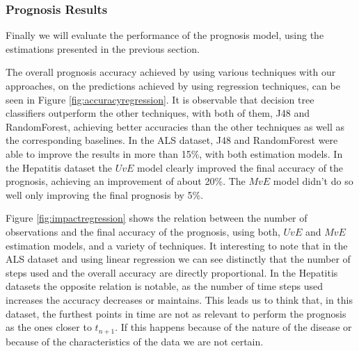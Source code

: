 \subsubsection{Prognosis Results}
\label{subsubsection:prognosis_regression}

Finally we will evaluate the performance of the prognosis model, using the estimations presented in the previous section.

The overall prognosis accuracy achieved by using various techniques with our approaches, on the predictions achieved by using regression 
techniques, can be seen in Figure \ref{fig:accuracyregression}. It is observable that decision tree classifiers outperform the other techniques, with
both of them, J48 and RandomForest, achieving better accuracies than the other techniques as well as the corresponding baselines. In the ALS dataset,  J48 and RandomForest were able to improve the results in more than 15\%, with both estimation models. In the Hepatitis dataset the $UvE$ model clearly improved the final accuracy of the prognosis, achieving an improvement of about 20\%. The $MvE$ model didn't do so well only improving the final prognosis by 5\%. 

Figure \ref{fig:impactregression} shows the relation between the number of observations and the final accuracy of the prognosis, using both, $UvE$ and $MvE$ estimation models, and a variety of techniques. It interesting to note that in the ALS dataset and using linear regression we can see distinctly that the number of steps used and the overall accuracy are directly proportional. In the Hepatitis datasets the opposite relation is notable, as the number of time steps used increases the accuracy decreases or maintains. This leads us to think that, in this dataset, the furthest points in time are not as relevant to perform the prognosis as the ones closer to $t_{n+1}$. If this happens because of the nature of the disease or because of the characteristics of the data we are not certain.

